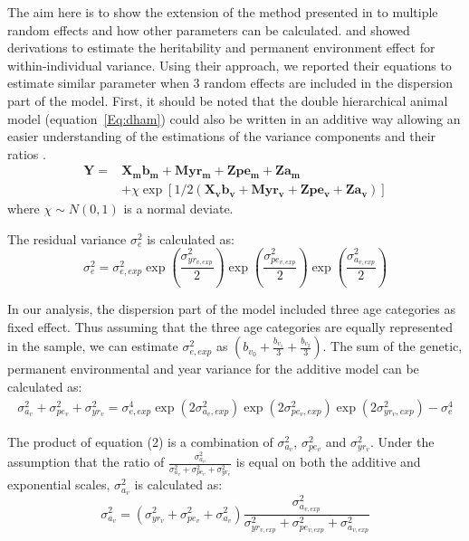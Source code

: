 \documentclass[a4paper,12pt,twoside]{article}
\begin{document}
	The aim here is to show the extension of the method presented in \citep{Mulder2007} to multiple random effects and how other parameters can be calculated.
	\cite{Felleki2012} and \cite{Sae-lim2015} showed derivations to estimate the heritability and permanent environment effect for within-individual variance.
	Using their approach, we reported their equations to estimate similar parameter when 3 random effects are included in the dispersion part of the model.
	First, it should be noted that the double hierarchical animal model (equation~\ref{Eq:dham}) could also be written in an additive way allowing an easier understanding of the estimations of the variance components and their ratios \citep{Sancristobal-gaudy1998}.
	\begin{equation}\label{Eq:dhamscg}
		\begin{aligned}
			\boldsymbol{Y} = &\boldsymbol{X_m b_m} + \boldsymbol{M yr_m} + \boldsymbol{Z pe_m} + \boldsymbol{Z a_m}\\
			&+ \chi \exp[1/2(\boldsymbol{X_v b_v} + \boldsymbol{M yr_v} + \boldsymbol{Z pe_v} + \boldsymbol{Z a_v})]
		\end{aligned}
	\end{equation}
	where $\chi \sim N(0,1)$ is a normal deviate.
	
	The residual variance $\sigma_e^2$ is calculated as:
	\begin{equation}
		\sigma_e^2 = \sigma_{e,exp}^2 \exp \left( \frac{\sigma_{yr_{v,exp}}^2}{2} \right) \exp \left( \frac{\sigma_{pe_{v,exp}}^2}{2} \right) \exp \left( \frac{\sigma_{a_{v,exp}}^2}{2} \right)
	\end{equation}
	
	In our analysis, the dispersion part of the model included three age categories as fixed effect.
	Thus assuming that the three age categories are equally represented in the sample, we can estimate $\sigma_{e,exp}^2$ as $\left( b_{v_0} + \frac{b_{v_1}}{3}+ \frac{b_{v_2}}{3} \right)$.
	The sum of the genetic, permanent environmental and year variance for the additive model can be calculated as:
	\begin{equation}
		\begin{aligned}
			\sigma_{a_v}^2 + \sigma_{pe_v}^2 + \sigma_{yr_v}^2 = \sigma_{e,exp}^4 \exp (2\sigma_{a_v,exp}^2)\exp (2\sigma_{pe_v,exp}^2)\exp (2\sigma_{yr_v,exp}^2) - \sigma_e^4
		\end{aligned}
	\end{equation}
	
	The product of equation (2) is a combination of $\sigma_{a_v}^2$, $\sigma_{pe_v}^2$ and $\sigma_{yr_v}^2$.
	Under the assumption that the ratio of $\frac{\sigma_{a_v}^2}{\sigma_{a_v}^2 + \sigma_{pe_v}^2 + \sigma_{yr_v}^2}$ is equal on both the additive and exponential scales, $\sigma_{a_v}^2$ is calculated as:
	\begin{equation}
		\sigma_{a_v}^2 = (\sigma_{yr_v}^2 + \sigma_{pe_v}^2 + \sigma_{a_v}^2 ) \frac{\sigma_{a_{v,exp}}^2}{\sigma_{yr_{v,exp}}^2 + \sigma_{pe_{v,exp}}^2 + \sigma_{a_{v,exp}}^2}
	\end{equation}
	
\end{document}
